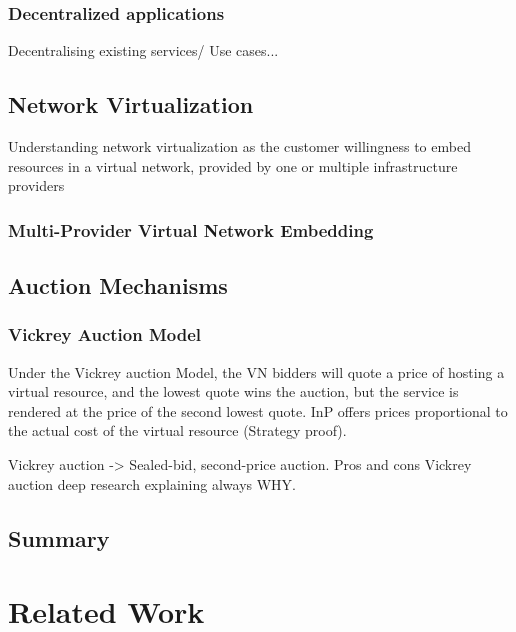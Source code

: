 \subsection{Decentralized applications}

Decentralising existing services/ Use cases...

\section{Network Virtualization}

Understanding network virtualization as the customer willingness to embed resources in a virtual network, provided by one or multiple infrastructure providers
\subsection{Multi-Provider Virtual Network Embedding}

\section{Auction Mechanisms}

\subsection{Vickrey Auction Model}

Under the Vickrey auction Model, the VN bidders will quote a price of hosting a virtual resource, and the lowest quote wins the auction, but the service is rendered at the price of the second lowest quote. InP offers prices proportional to the actual cost of the virtual resource (Strategy proof).

Vickrey auction -> Sealed-bid, second-price auction.
Pros and cons Vickrey auction deep research explaining always WHY.

\section{Summary}


\chapter{Related Work}
\label{ch:relatedwork}
